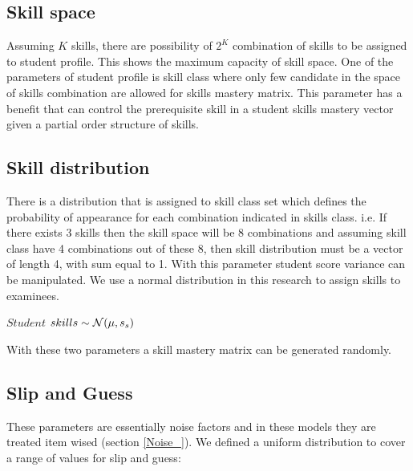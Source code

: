  
\subsection{Skill space}
Assuming $K$ skills, there are possibility of $2^K$ combination of skills to be assigned to student profile. This shows the maximum capacity of skill space. One of the parameters of student profile is skill class where only few candidate in the space of skills combination are allowed for skills mastery matrix. This parameter has a benefit that can control the prerequisite skill in a student skills mastery vector given a partial order structure of skills.

\subsection{Skill distribution}

There is a distribution that is assigned to skill class set which defines the probability of appearance for each combination indicated in skills class. i.e. If there exists 3 skills then the skill space will be 8 combinations and assuming skill class have 4 combinations out of these 8, then skill distribution  must be a vector of length 4, with sum equal to 1. With this parameter student score variance can be manipulated. We use a normal distribution in this research to assign skills to examinees.



\begin{center}
$Student$  $skills \sim \mathcal{N}(\mu, s_s)$
\end{center}

With these two parameters a skill mastery matrix can be generated randomly.

\subsection{Slip and Guess}
These parameters are essentially noise factors and in these models they are treated item wised (section \ref{Noise_}). We defined a uniform distribution to cover a range of values for slip and guess:


